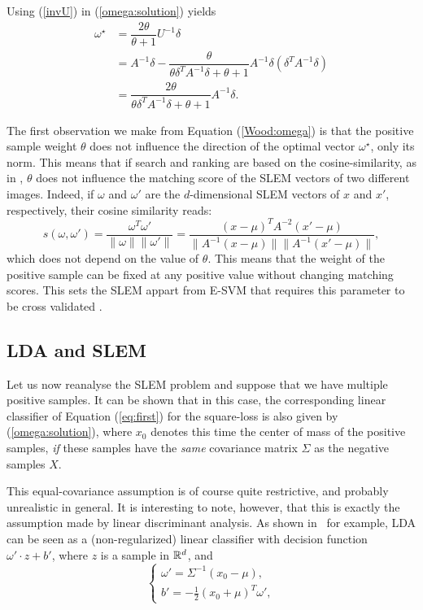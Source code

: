 Using (\ref{invU}) in (\ref{omega:solution}) yields
\begin{equation}
\begin{split}
\omega^\star &= \dfrac{2\theta}{\theta+1}U^{-1}\delta \\
&= A^{-1}\delta - \dfrac{\theta}{\theta\delta^TA^{-1}\delta+ \theta+1} A^{-1}\delta (\delta^TA^{-1}\delta)\\
&= \dfrac{2\theta}{\theta\delta^TA^{-1}\delta+ \theta+1} A^{-1}\delta.\label{Wood:omega}
\end{split}
\end{equation}

The first observation we make from Equation (\ref{Wood:omega}) is that the positive sample weight $\theta$ does not influence the direction of the optimal vector $\omega^\star$, only its norm. This means that if search and ranking are based on the cosine-similarity, as in \cite{ZePe15}, $\theta$ does not influence the matching score of the SLEM vectors of two different images.
Indeed, if $\omega$ and $\omega'$ are the $d$-dimensional SLEM vectors of $x$ and $x'$, respectively, their cosine similarity reads:
\begin{equation}
s(\omega, \omega') = \dfrac{\omega^T \omega'}{\|\omega\| \|\omega'\|} = \frac{(x-\mu)^TA^{-2}(x'-\mu)}{\|A^{-1}(x-\mu)\|\|A^{-1}(x'-\mu)\|},\label{match:score}
\end{equation}
which does not depend on the value of $\theta$. This means that the weight of the positive sample can be fixed at any positive value without changing matching scores. This sets the SLEM appart from E-SVM that requires this parameter to be cross validated \cite{Efros11, ZePe15}.
\subsection{LDA and SLEM}

Let us now reanalyse the SLEM problem and suppose that we have multiple positive samples. It can be shown that in this case, the corresponding linear classifier of Equation (\ref{eq:first}) for the square-loss is also given by
(\ref{omega:solution}), where $x_0$ denotes this time the center of mass
of the positive samples, {\em if} these samples have the {\em same} covariance matrix $\Sigma$ as the negative samples $X$.
 
This equal-covariance assumption is of course quite restrictive, and
probably unrealistic in general. It is interesting to note, however,
that this is exactly the assumption made by linear discriminant
analysis. As shown in~\cite{Hastie2009} for example, LDA can be seen as a
(non-regularized) linear classifier
with decision function $\omega'\cdot z+ b'$, where $z$ is a sample in
$\mathbb R^d$, and
\begin{equation}
\left\{\begin{array}{l}
\displaystyle \omega'=\Sigma^{-1}(x_0-\mu),\\
\displaystyle b'=-\frac{1}{2}(x_0+\mu)^T \omega',
\end{array}\right.
\label{eq:lda}
\end{equation}
 
